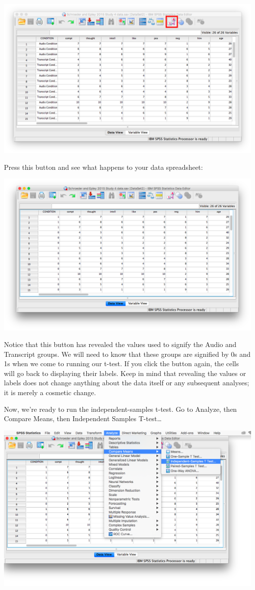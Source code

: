 \documentclass[
]{book}
\begin{document}
\includegraphics{img/7.4.12.png}

Press this button and see what happens to your data spreadsheet:

\includegraphics{img/7.4.13.png}

Notice that this button has revealed the values used to signify the Audio and Transcript groups. We will need to know that these groups are signified by 0s and 1s when we come to running our t-test. If you click the button again, the cells will go back to displaying their labels. Keep in mind that revealing the values or labels does not change anything about the data itself or any subsequent analyses; it is merely a cosmetic change.

Now, we're ready to run the independent-samples t-test. Go to {Analyze}, then {Compare Means}, then {Independent Samples T-test\ldots{}}

\includegraphics{img/7.4.14.png}
\end{document}
